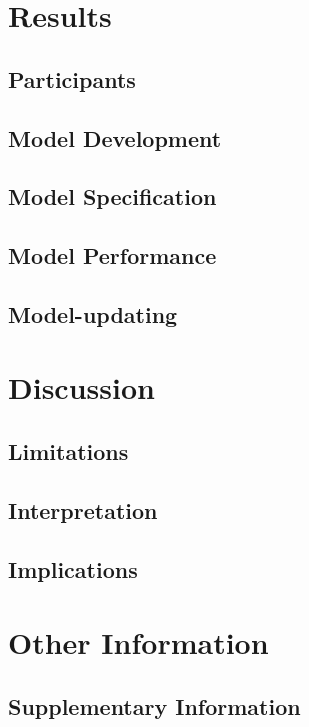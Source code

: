 \documentclass[]{article}
\begin{document}
\section{Results}
\subsection{Participants} %

\subsection{Model Development} %

\subsection{Model Specification} %

\subsection{Model Performance} %

\subsection{Model-updating} %


\section{Discussion}
\subsection{Limitations} %

\subsection{Interpretation} %

\subsection{Implications} %

\section{Other Information}
\subsection{Supplementary Information} %
\end{document}
